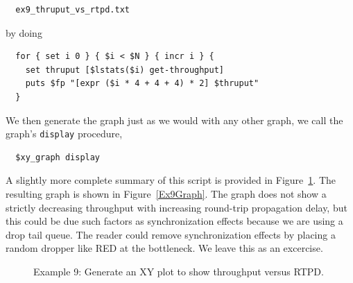 \documentclass[11pt]{article}
\begin{document}
\begin{verbatim}
  ex9_thruput_vs_rtpd.txt
\end{verbatim}

\noindent by doing 

\begin{verbatim}
  for { set i 0 } { $i < $N } { incr i } {
    set thruput [$lstats($i) get-throughput]
    puts $fp "[expr ($i * 4 + 4 + 4) * 2] $thruput"
  }
\end{verbatim}

We then generate the graph just as we would with any other 
graph, we call the graph's \verb|display| procedure,

\begin{verbatim}
  $xy_graph display
\end{verbatim}

A slightly more complete summary of this script is provided in 
Figure~\ref{Ex9Figure}.  The resulting graph is shown in 
Figure~\ref{Ex9Graph}.  The graph does not show a strictly decreasing 
throughput with increasing round-trip propagation delay, but this could 
be due such factors as synchronization effects because we are using a drop 
tail queue.  The reader could remove synchronization effects by placing
a random dropper like RED at the bottleneck.  We leave this as an
excercise.

\begin{figure}[ht]
\begin{center}
\end{center}
\caption{Example 9: Generate an XY plot to show throughput versus RTPD.}
\label{Ex9Figure}
\end{figure}
\end{document}

